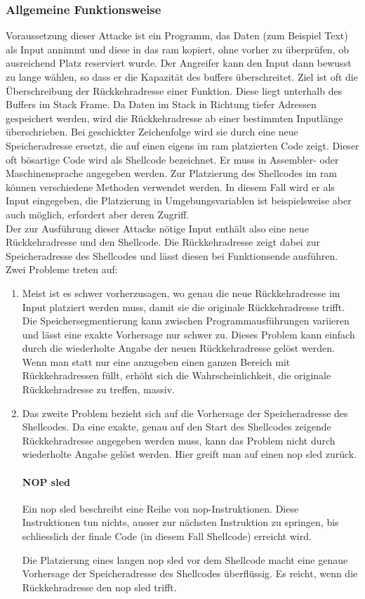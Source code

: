 \documentclass[11pt, a4paper]{article}
\begin{document}
\subsubsection{Allgemeine Funktionsweise}
Voraussetzung dieser Attacke ist ein Programm, das Daten (zum Beispiel Text) als Input annimmt und diese in das \gls{ram} kopiert, ohne vorher zu überprüfen, ob ausreichend Platz reserviert wurde. Der Angreifer kann den Input dann bewusst zu lange wählen, so dass er die Kapazität des buffers überschreitet. Ziel ist oft die Überschreibung der Rückkehradresse einer Funktion. Diese liegt unterhalb des Buffers im Stack Frame. Da Daten im Stack in Richtung tiefer Adressen gespeichert werden, wird die Rückkehradresse ab einer bestimmten Inputlänge überschrieben. Bei geschickter Zeichenfolge wird sie durch eine neue Speicheradresse ersetzt, die auf einen eigens im \gls{ram} platzierten Code zeigt. Dieser oft bösartige Code wird als Shellcode bezeichnet. Er muss in Assembler- oder Maschinensprache angegeben werden. Zur Platzierung des Shellcodes im \gls{ram} können verschiedene Methoden verwendet werden. In diesem Fall wird er als Input eingegeben, die Platzierung in Umgebungsvariablen ist beispielsweise aber auch möglich, erfordert aber deren Zugriff. \\Der zur Ausführung dieser Attacke nötige Input enthält also eine neue Rückkehradresse und den Shellcode. Die Rückkehradresse zeigt dabei zur Speicheradresse des Shellcodes und lässt diesen bei Funktionsende ausführen. Zwei Probleme treten auf:
\begin{enumerate}
	\item Meist ist es schwer vorherzusagen, wo genau die neue Rückkehradresse im Input platziert werden muss, damit sie die originale Rückkehradresse trifft. Die Speichersegmentierung kann zwischen Programmausführungen variieren und lässt eine exakte Vorhersage nur schwer zu. Dieses Problem kann einfach durch die wiederholte Angabe der neuen Rückkehradresse gelöst werden. Wenn man statt nur eine anzugeben einen ganzen Bereich mit Rückkehradressen füllt, erhöht sich die Wahrscheinlichkeit, die originale Rückkehradresse zu treffen, massiv.
	\item Das zweite Problem bezieht sich auf die Vorhersage der Speicheradresse des Shellcodes. Da eine exakte, genau auf den Start des Shellcodes zeigende Rückkehradresse angegeben werden muss, kann das Problem nicht durch wiederholte Angabe gelöst werden. Hier greift man auf einen \gls{nop} sled zurück.
	\paragraph{NOP sled}
	Ein \gls{nop} sled beschreibt eine Reihe von \gls{nop}-Instruktionen. Diese Instruktionen tun nichts, ausser zur nächsten Instruktion zu springen, bis schliesslich der finale Code (in diesem Fall Shellcode) erreicht wird.
	
	Die Platzierung eines langen \gls{nop} sled vor dem Shellcode macht eine genaue Vorhersage der Speicheradresse des Shellcodes überflüssig. Es reicht, wenn die Rückkehradresse den \gls{nop} sled trifft.
\end{enumerate}
\end{document}
